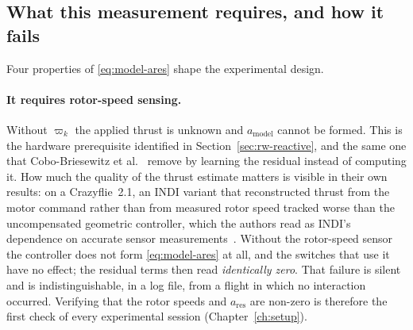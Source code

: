 \subsection{What this measurement requires, and how it fails}
\label{sec:model-measure-fail}

Four properties of \eqref{eq:model-ares} shape the experimental design.

\paragraph{It requires rotor-speed sensing.} Without $\varpi_k$ the applied thrust is unknown and
$a_{\mathrm{model}}$ cannot be formed. This is the hardware prerequisite identified in
Section~\ref{sec:rw-reactive}, and the same one that Cobo-Briesewitz et
al.~\cite{cobobriesewitz2026lindi} remove by learning the residual instead of computing it.
How much the quality of the thrust estimate matters is visible in their own results: on a
Crazyflie~2.1, an INDI variant that reconstructed thrust from the motor command rather than from
measured rotor speed tracked worse than the uncompensated geometric controller, which the authors
read as INDI's dependence on accurate sensor measurements~\cite{cobobriesewitz2026lindi}.
Without the rotor-speed sensor the controller does not form \eqref{eq:model-ares} at all, and the
switches that use it have no effect; the residual terms then read \emph{identically zero}. That
failure is silent and is indistinguishable, in a log file, from a flight in which no interaction
occurred. Verifying that the rotor speeds and $a_{\mathrm{res}}$ are non-zero is therefore the first
check of every experimental session (Chapter~\ref{ch:setup}).

